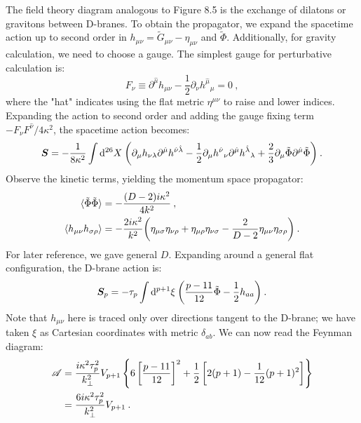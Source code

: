 The field theory diagram analogous to Figure 8.5 is the exchange of dilatons or gravitons between D-branes. To obtain the propagator, 
we expand the spacetime action up to second order in $h_{\mu\nu}=\tilde{G}_{\mu\nu}-\eta_{\mu\nu}$ and $\tilde{\Phi}$. 
Additionally, for gravity calculation, we need to choose a gauge. 
The simplest gauge for perturbative calculation is:
\begin{equation}
	F_{\nu} \equiv \partial^{\hat{\mu}} h_{\mu \nu}-\frac{1}{2} \partial_{\nu} h^{\hat{\mu}}{}_{\mu}=0 \:, \label{8.7.21}
\end{equation}
where the "hat" indicates using the flat metric $\eta^{\mu \nu}$ to raise and lower indices. 
Expanding the action to second order and adding the gauge fixing term $-F_{\nu} F^{\hat{\nu}} / 4\kappa^{2}$, 
the spacetime action becomes:
\begin{equation}
	\bm{S}=-\frac{1}{8 \kappa^{2}} \int \mathrm{d}^{26} X \: \biggl( \partial_{\mu} h_{\nu \lambda} 
	\partial^{\hat{\mu}} h^{\hat{\nu} \hat{\lambda}}-\frac{1}{2} \partial_{\mu} h^{\hat{\nu}}{}_{\nu} 
	\partial^{\hat{\mu}} h^{\hat{\lambda}}{}_{\lambda}+\frac{2}{3} \partial_{\mu} \tilde{\Phi} \partial^{\hat{\mu}} \tilde{\Phi}\biggr) \:. \label{8.7.22}
\end{equation}
Observe the kinetic terms, yielding the momentum space propagator:
\begin{subequations} \label{8.7.23}
	\begin{align}
		\langle\tilde{\Phi} \tilde{\Phi}\rangle &=-\frac{(D-2) i \kappa^{2}}{4 k^{2}}  \:, \label{8.7.23a} \\
		\langle h_{\mu \nu} h_{\sigma \rho}\rangle &=-\frac{2 i \kappa^{2}}{k^{2}}
		\biggl(\eta_{\mu \sigma} \eta_{\nu \rho}+\eta_{\mu \rho} \eta_{\nu \sigma}-\frac{2}{D-2} \eta_{\mu \nu} \eta_{\sigma \rho}\biggr) \:. \label{8.7.23b}
	\end{align}
\end{subequations}
For later reference, we gave general $D$. Expanding around a general flat configuration, the D-brane action is:
\begin{equation}
	\bm{S}_{p}=-\tau_{p} \int \mathrm{d}^{p+1} \xi \: \biggl(\frac{p-11}{12} \tilde{\Phi}-\frac{1}{2} h_{aa}\biggr) \:. \label{8.7.24}
\end{equation}
Note that $h_{\mu \nu}$ here is traced only over directions tangent to the D-brane; we have taken $\xi$ as Cartesian coordinates with metric $\delta_{ab}$. 
We can now read the Feynman diagram:
\begin{align}
	\mathscr{A} &= \frac{i \kappa^{2} \tau_{p}^{2}}{k_{\perp}^{2}} V_{p+1} 
	\left\{6\left[\frac{p-11}{12}\right]^{2}+\frac{1}{2}\left[2(p+1)-\frac{1}{12}(p+1)^{2}\right]\right\} \nonumber \\
	& =\frac{6 i \kappa^{2} \tau_{p}^{2}}{k_{\perp}^{2}} V_{p+1} \:. \label{8.7.25}
\end{align}
